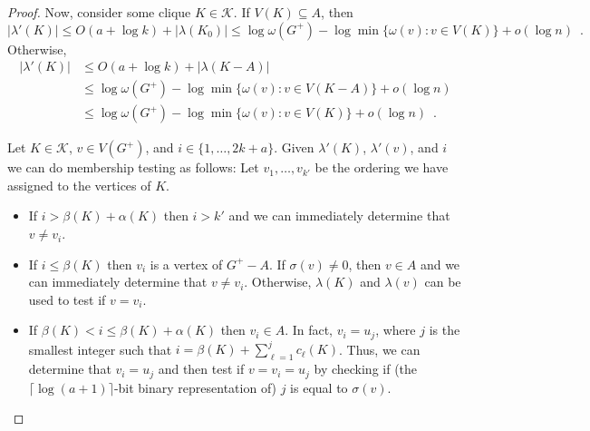 \documentclass{patmorin}
\renewcommand{\le}{\leqslant}
\begin{document}
\begin{proof}
    Now, consider some clique $K\in\mathcal{K}$.  If $V(K)\subseteq A$, then
    \[
       |\lambda'(K)|\le O(a + \log k) + |\lambda(K_0)| \le\log\omega(G^+) - \log\min\{\omega(v):v\in V(K)\} + o(\log n) \enspace .
    \]
    Otherwise,
    \begin{align*}
       |\lambda'(K)|
       & \le O(a + \log k) +|\lambda(K-A)| \\
       & \le \log\omega(G^+)-\log\min\{\omega(v):v\in V(K-A)\} + o(\log n) \\
       & \le \log\omega(G^+)-\log\min\{\omega(v):v\in V(K)\} + o(\log n) \enspace .
    \end{align*}

    Let $K\in\mathcal{K}$, $v\in V(G^+)$, and $i\in\{1,\ldots,2k+a\}$.
    Given $\lambda'(K)$, $\lambda'(v)$, and $i$ we can do membership testing as follows:
    Let $v_1,\ldots,v_{k'}$ be the ordering we have assigned to the vertices of $K$.
    \begin{itemize}
        \item If $i> \beta(K)+\alpha(K)$ then $i > k'$ and we can immediately determine that $v\neq v_i$.
        \item If $i \le \beta(K)$ then $v_i$ is a vertex of $G^+-A$.  If $\sigma(v)\neq 0$, then $v\in A$ and we can immediately determine that $v\neq v_i$.  Otherwise, $\lambda(K)$ and $\lambda(v)$ can be used to test if $v=v_i$.
        \item If $\beta(K) < i \le \beta(K)+\alpha(K)$ then $v_i\in A$. In fact, $v_i=u_j$, where $j$ is the smallest integer such that $i = \beta(K) + \sum_{\ell=1}^j c_\ell(K)$.  Thus, we can determine that $v_i=u_j$ and then test if $v=v_i=u_j$ by checking if (the $\lceil\log (a+1)\rceil$-bit binary representation of) $j$ is equal to $\sigma(v)$. \qedhere
    \end{itemize}
  \end{proof}








\end{document}
